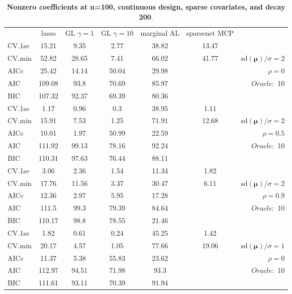 \clearpage
\begin{table}\vspace{-.5cm}
\caption[l]{ { \bf Nonzero coefficients at n=100, continuous design, 
sparse covariates, and  decay  200}.}
\vspace{-.5cm}
\footnotesize{}
\begin{center}
\begin{tabular}{l*{5}{c}|r}
& lasso & GL $\gamma=1$ & GL $\gamma=10$ & marginal AL & sparsenet MCP  & \\
 \cline{1-7}
CV.1se & 15.21 & 9.35 & 2.77 & 38.82 & 13.47 & \\
CV.min & 52.82 & 28.65 & 7.41 & 66.02 & 41.77 &  $\mathrm{sd}(\mathbf{\mu})/\sigma=2$ \\
AICc & 25.42 & 14.14 & 50.04 & 29.98 & & $\rho=0$ \\
AIC & 109.08 & 93.8 & 70.69 & 85.97 & &  \multirow{2}{*}{$Oracle: $ 10} \\
BIC & 107.32 & 92.37 & 69.39 & 80.36 & &  \\
 \hline 
CV.1se & 1.17 & 0.96 & 0.3 & 38.95 & 1.11 & \\
CV.min & 15.91 & 7.53 & 1.25 & 71.91 & 12.68 &  $\mathrm{sd}(\mathbf{\mu})/\sigma=2$ \\
AICc & 10.01 & 1.97 & 50.99 & 22.59 & & $\rho=0.5$ \\
AIC & 111.92 & 99.13 & 78.16 & 92.24 & &  \multirow{2}{*}{$Oracle: $ 10} \\
BIC & 110.31 & 97.63 & 76.44 & 88.11 & &  \\
 \hline 
CV.1se & 3.06 & 2.36 & 1.54 & 11.34 & 1.82 & \\
CV.min & 17.76 & 11.56 & 3.37 & 30.47 & 6.11 &  $\mathrm{sd}(\mathbf{\mu})/\sigma=2$ \\
AICc & 12.36 & 2.97 & 5.95 & 17.28 & & $\rho=0.9$ \\
AIC & 111.5 & 99.3 & 79.39 & 84.64 & &  \multirow{2}{*}{$Oracle: $ 10} \\
BIC & 110.17 & 98.8 & 78.55 & 21.46 & &  \\
 \hline 
CV.1se & 1.82 & 0.61 & 0.24 & 45.25 & 1.42 & \\
CV.min & 20.17 & 4.57 & 1.05 & 77.66 & 19.06 &  $\mathrm{sd}(\mathbf{\mu})/\sigma=1$ \\
AICc & 11.37 & 5.38 & 55.83 & 23.62 & & $\rho=0$ \\
AIC & 112.97 & 94.51 & 71.98 & 93.3 & &  \multirow{2}{*}{$Oracle: $ 10} \\
BIC & 111.61 & 93.11 & 70.39 & 91.94 & &  \\

\end{tabular}
\end{center}
\end{table}
